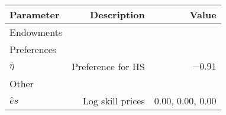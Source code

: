 \begin{tabular}{lrr}
\hline
Parameter & Description  & Value  \\ 
\hline
Endowments &   &   \\ 
Preferences &   &   \\ 
$\bar{\eta}$ & Preference for HS  & $-0.91$  \\ 
Other &   &   \\ 
$\hat{e}{s}$ & Log skill prices  & 0.00, 0.00, 0.00  \\ 
\hline
\end{tabular}%
